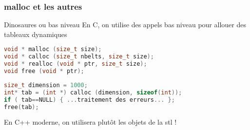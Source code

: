 \documentclass{beamer}
\begin{document}
\begin{frame}[fragile=singleslide,shrink=20]
\frametitle{malloc et les autres}

\begin{block}{Dinosaures ou bas niveau}
En C, on utilise des appels bas niveau pour allouer des tableaux dynamiques
\end{block}

\begin{lstlisting}[language=c++]
void * malloc (size_t size);
void * calloc (size_t nbelts, size_t size);
void * realloc (void * ptr, size_t size);
void free (void * ptr);
\end{lstlisting}

\begin{lstlisting}[language=c++]
size_t dimension = 1000;
int* tab = (int *) calloc (dimension, sizeof(int));
if ( tab==NULL) { ...traitement des erreurs... };
free(tab);
\end{lstlisting}

\begin{block}{}
En C++ moderne, on utilisera plutôt les objets de la stl !
\end{block}
\end{frame}
\end{document}
